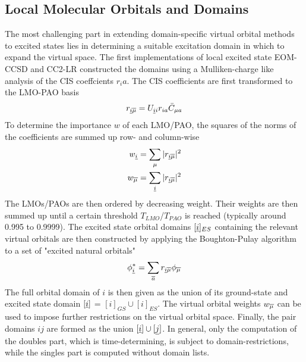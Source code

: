 \subsection{Local Molecular Orbitals and Domains}

The most challenging part in extending domain-specific virtual orbital methods to excited states lies in determining a suitable excitation domain in which to expand the virtual space. The first implementations of local excited state EOM-CCSD \cite{Kor2003,Cra2002} and CC2-LR \cite{Kat2003} constructed the domains using a Mulliken-charge like analysis of the CIS coeffcients $r_ia$. The CIS coefficients are first transformed to the LMO-PAO basis
\begin{equation}
r_{\underline{i} \overline{\mu}} = U_{\underline{i} i } r_{ia} \bar{C}_{\mu a} 
\end{equation}
\noindent To determine the importance $w$ of each LMO/PAO, the squares of the norms of the coefficients are summed up row- and column-wise
\begin{equation}
\begin{split}
w_{\underline{i}} &= \sum_{\mu} |r_{\underline{i} \overline{\mu}}|^2 \\
w_{\overline{\mu}} &= \sum_{\underline{i}} |r_{\underline{i} \overline{\mu}}|^2
\end{split}
\end{equation}
\noindent The LMOs/PAOs are then ordered by decreasing weight. Their weights are then summed up until a certain threshold $T_{LMO}$/$T_{PAO}$ is reached (typically around 0.995 to 0.9999). The excited state orbital domains $[\underline{i}]_{ES}$ containing the relevant virtual orbitals are then constructed by applying the Boughton-Pulay algorithm to a set of "excited natural orbitals" \cite{Kor2003}
\begin{equation}
\phi_{\underline{i}}^* = \sum_{\overline{a}} r_{\underline{i} \overline{\mu}} \phi_{\overline{\mu}}  
\end{equation} 
\noindent The full orbital domain of $i$ is then given as the union of its ground-state and excited state domain $[\underline{i}]$ = $[i]_{GS} \cup [i]_{ES}$. The virtual orbital weights $w_{\overline{\mu}}$ can be used to impose further restrictions on the virtual orbital space. Finally, the pair domains $ij$ are formed as the union $[\underline{i}] \cup [\underline{j}]$. In general, only the computation of the doubles part, which is time-determining, is subject to domain-restrictions, while the singles part is computed without domain lists.

